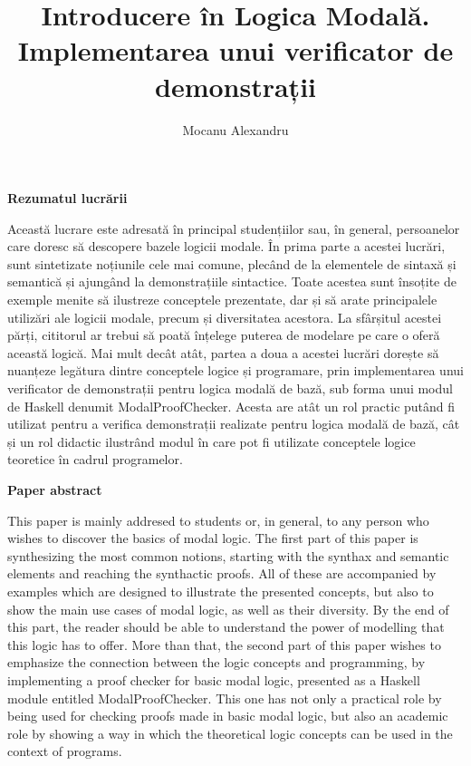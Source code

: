 \documentclass[12pt, openany]{book}
\author{
    Mocanu Alexandru
}
\title{Introducere în Logica Modală.\\ Implementarea unui verificator de demonstrații}
\begin{document}
    \pagestyle{empty} %
    


    \par{}
    \centerline{\Large \textbf{Rezumatul lucrării}}
    \vspace{20pt}
        Această lucrare este adresată în principal studențiilor sau, în general, persoanelor care doresc să descopere 
        bazele logicii modale. În prima parte a acestei lucrări, sunt sintetizate noțiunile cele mai comune, plecând de 
        la elementele de sintaxă și semantică și ajungând la demonstrațiile sintactice. Toate acestea sunt însoțite
        de exemple menite să ilustreze conceptele prezentate, dar și să arate principalele utilizări ale logicii modale, 
        precum și diversitatea acestora. La sfârșitul acestei părți, cititorul ar trebui să poată înțelege puterea de 
        modelare pe care o oferă această logică. Mai mult decât atât, partea a doua a acestei lucrări dorește să 
        nuanțeze legătura dintre conceptele logice și programare, prin implementarea unui verificator de demonstrații 
        pentru logica modală de bază, sub forma unui modul de Haskell denumit ModalProofChecker. Acesta are atât un rol 
        practic putând fi utilizat pentru a verifica demonstrații realizate pentru logica modală de bază, cât și un rol 
        didactic ilustrând modul în care pot fi utilizate conceptele logice teoretice în cadrul programelor.
    
    \vspace{100pt}
    \par{}
    \centerline{\Large \textbf{Paper abstract}}
    \vspace{20pt}
        This paper is mainly addresed to students or, in general, to any person who wishes to discover the basics of 
        modal logic. The first part of this paper is synthesizing the most common notions, starting with the synthax and 
        semantic elements and reaching the synthactic proofs. All of these are accompanied by examples which are 
        designed to illustrate the presented concepts, but also to show the main use cases of modal logic, as well as 
        their diversity. By the end of this part, the reader should be able to understand the power of modelling that 
        this logic has to offer. More than that, the second part of this paper wishes to emphasize the connection 
        between the logic concepts and programming, by implementing a proof checker for basic modal logic, presented as 
        a Haskell module entitled ModalProofChecker. This one has not only a practical role by being used for checking 
        proofs made in basic modal logic, but also an academic role by showing a way in which the theoretical logic 
        concepts can be used in the context of programs.
    
\end{document}
